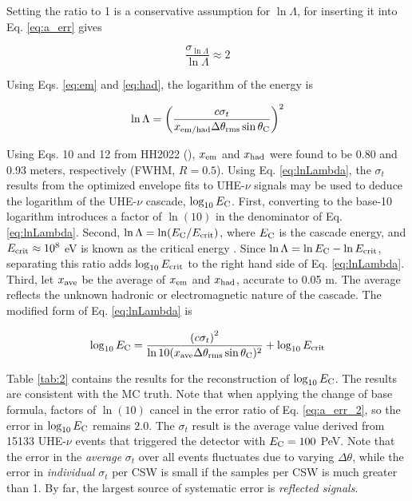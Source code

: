 \documentclass[amsmath,amssymb,aps,prd,10pt,twocolumn,showkeys]{revtex4}
\begin{document}
Setting the ratio to 1 is a conservative assumption for $\ln\Lambda$, for inserting it into Eq. \ref{eq:a_err} gives

\begin{equation}
\frac{\sigma_{\ln\Lambda}}{\ln\Lambda} \approx 2 \label{eq:a_err_2}
\end{equation}

Using Eqs. \ref{eq:em} and \ref{eq:had}, the logarithm of the energy is

\begin{equation}
\ln\Lambda = \left( \frac{c\sigma_t}{x_{\rm em/had} \Delta\theta_{\rm rms}\sin\theta_{\rm C}} \right)^2 \label{eq:lnLambda}
\end{equation}

Using Eqs. 10 and 12 from HH2022 (\cite{PhysRevD.105.123019}), $x_{\rm em}$ and $x_{\rm had}$ were found to be 0.80 and 0.93 meters, respectively (FWHM, $R=0.5$).  Using Eq. \ref{eq:lnLambda}, the $\sigma_t$ results from the optimized envelope fits to UHE-$\nu$ signals may be used to deduce the logarithm of the UHE-$\nu$ cascade, $\log_{10} E_{\rm C}$.  First, converting to the base-10 logarithm introduces a factor of $\ln(10)$ in the denominator of Eq. \ref{eq:lnLambda}.  Second, $\ln\Lambda = \ln(E_{\rm C}/E_{\rm crit})$, where $E_{\rm C}$ is the cascade energy, and $E_{\rm crit}\approx 10^8$ eV is known as the critical energy \cite{PhysRevD.105.123019}.  Since $\ln\Lambda = \ln E_{\rm C} - \ln E_{\rm crit}$, separating this ratio adds $\log_{10} E_{\rm crit}$ to the right hand side of Eq. \ref{eq:lnLambda}.  Third, let $x_{\rm ave}$ be the average of $x_{\rm em}$ and $x_{\rm had}$, accurate to 0.05 m.  The average reflects the unknown hadronic or electromagnetic nature of the cascade.  The modified form of Eq. \ref{eq:lnLambda} is

\begin{equation}
\log_{10} E_{\rm C} = \frac{\left( c\sigma_t \right)^2}{\ln 10(x_{\rm ave} \Delta\theta_{\rm rms}\sin\theta_{\rm C})^2} + \log_{10} E_{\rm crit} \label{eq:lnLambda_2}
\end{equation}

Table \ref{tab:2} contains the results for the reconstruction of $\log_{10}E_{\rm C}$.  The results are consistent with the MC truth.  Note that when applying the change of base formula, factors of $\ln(10)$ cancel in the error ratio of Eq. \ref{eq:a_err_2}, so the error in $\log_{10} E_{\rm C}$ remains $2.0$.  The $\sigma_t$ result is the average value derived from 15133 UHE-$\nu$ events that triggered the detector with $E_{\rm C} = 100$ PeV.  Note that the error in the \textit{average} $\sigma_t$ over all events fluctuates due to varying $\Delta\theta$, while the error in \textit{individual} $\sigma_t$ per CSW is small if the samples per CSW is much greater than 1.  By far, the largest source of systematic error is \textit{reflected signals}.
\end{document}
